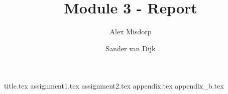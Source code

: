 \documentclass[final]{scrreprt} %
\title{Module 3 - Report}
\author{Alex {Misdorp} \and Sander {van Dijk}}
\begin{document}

{title.tex}
\newpage
{}
{assignment1.tex}
{assignment2.tex}
{appendix.tex}
{appendix_b.tex}
\newpage
{}

\printbibliography
\end{document}
